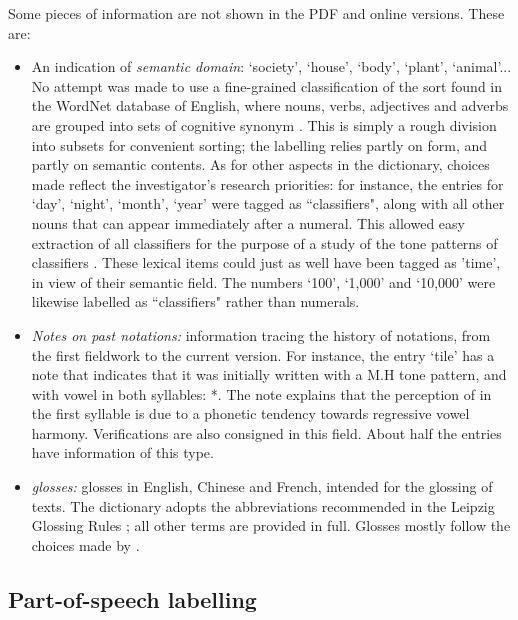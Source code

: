 Some pieces of information are not shown in the PDF and online versions. These are:
\begin{itemize}
	\item An indication of \textit{semantic domain}: ‘society', ‘house', ‘body', ‘plant', ‘animal'... No attempt was made to use a fine-grained classification of the sort found in the WordNet database of English, where nouns, verbs, adjectives and adverbs are grouped into sets of cognitive synonym \citep{Fellbaum 2005}. This is simply a rough division into subsets for convenient sorting; the labelling relies partly on form, and partly on semantic contents. As for other aspects in the dictionary, choices made reflect the investigator's research priorities: for instance, the entries for ‘day’, ‘night’, ‘month’, ‘year’ were tagged as “classifiers", along with all other nouns that can appear immediately after a numeral. This allowed easy extraction of all classifiers for the purpose of a study of the tone patterns of classifiers \citep{Michaud2013}. These lexical items could just as well have been tagged as 'time', in view of their semantic field. The numbers ‘100’, ‘1,000’ and ‘10,000’ were likewise labelled as “classifiers" rather than numerals.
	\item \textit{Notes on past notations:} information tracing the history of notations, from the first fieldwork to the current version. For instance, the entry  ‘tile' has a note that indicates that it was initially written with a M.H tone pattern, and with vowel  in both syllables: *. The note explains that the perception of  in the first syllable is due to a phonetic tendency towards regressive vowel harmony. Verifications are also consigned in this field. About half the entries have information of this type.
	\item \textit{glosses:} glosses in English, Chinese and French, intended for the glossing of texts. The dictionary adopts the abbreviations recommended in the Leipzig Glossing Rules \citep{Comrie}; all other terms are provided in full. Glosses mostly follow the choices made by \citep{Lidz2010}.
\end{itemize}

	\subsection{Part-of-speech labelling} \label{sec:pos}
	
